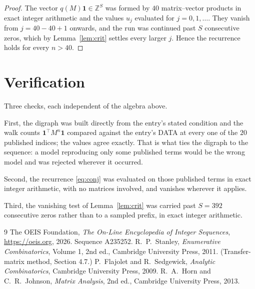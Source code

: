 \documentclass[11pt,a4paper]{article}
\theoremstyle{plain}
\theoremstyle{definition}
\begin{document}
\begin{proof}
The vector $q(M)\mathbf{1}\in\mathbb{Z}^{S}$ was formed by $40$ matrix--vector
products in exact integer arithmetic and the values $u_j$ evaluated for
$j=0,1,\dots$. They vanish from $j=40-40+1$ onwards, and the run was continued past
$S$ consecutive zeros, which by Lemma~\ref{lem:crit} settles every larger $j$. Hence the
recurrence holds for every $n>40$.
\end{proof}

\section{Verification}

Three checks, each independent of the algebra above.

First, the digraph was built directly from the entry's stated condition and the walk counts
$\mathbf{1}^{\!\top}M^{n}\mathbf{1}$ compared against the entry's DATA at every one of
the $20$ published indices; the values agree exactly. That is what ties the digraph to
the sequence: a model reproducing only some published terms would be the wrong model and
was rejected wherever it occurred.

Second, the recurrence \eqref{eq:conj} was evaluated on those published terms in exact
integer arithmetic, with no matrices involved, and vanishes wherever it applies.

Third, the vanishing test of Lemma~\ref{lem:crit} was carried past $S=392$ consecutive
zeros rather than to a sampled prefix, in exact integer arithmetic.

\begin{thebibliography}{9}
 The OEIS Foundation, \emph{The On-Line Encyclopedia of Integer
Sequences}, \url{https://oeis.org}, 2026. Sequence A235252.
 R.~P.~Stanley, \emph{Enumerative Combinatorics}, Volume 1, 2nd ed.,
Cambridge University Press, 2011. (Transfer-matrix method, Section 4.7.)
 P.~Flajolet and R.~Sedgewick, \emph{Analytic Combinatorics}, Cambridge
University Press, 2009.
 R.~A.~Horn and C.~R.~Johnson, \emph{Matrix Analysis}, 2nd ed., Cambridge
University Press, 2013.
\end{thebibliography}
\end{document}
